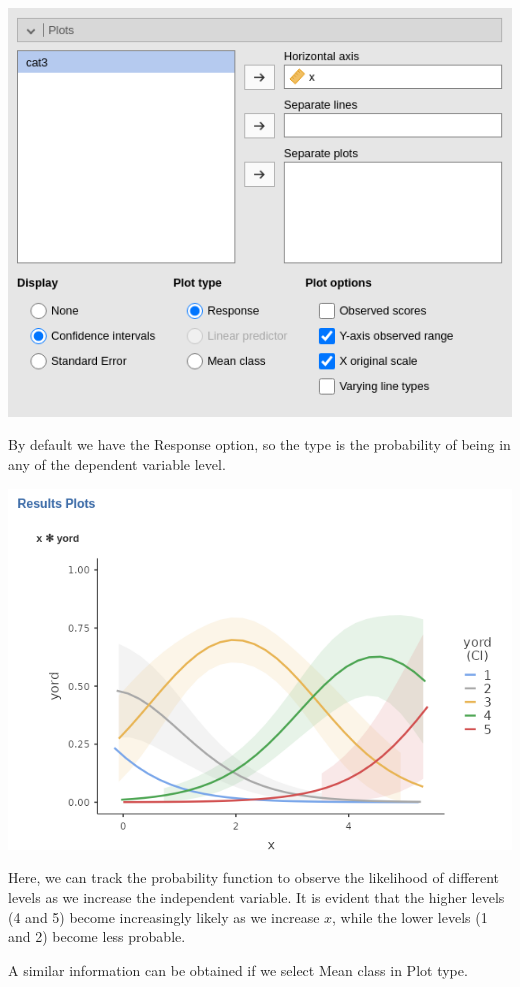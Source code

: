\documentclass[
]{book}
\begin{document}
\includegraphics[width=7.79in]{bookletpics/3_ordinal_input3}

By default we have the {Response} option, so the type is the probability of being in any of the dependent variable level.

\includegraphics[width=8.88in]{bookletpics/3_ordinal_plot1}

Here, we can track the probability function to observe the likelihood of different levels as we increase the independent variable. It is evident that the higher levels (4 and 5) become increasingly likely as we increase \(x\), while the lower levels (1 and 2) become less probable.

A similar information can be obtained if we select {Mean class} in {Plot type}.
\end{document}
